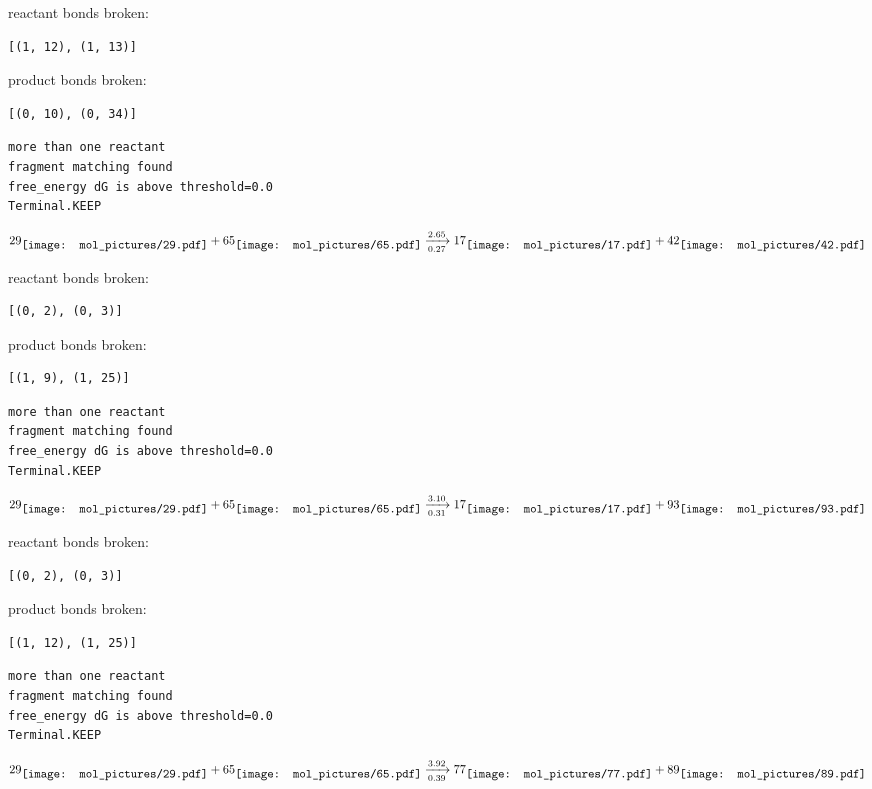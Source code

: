 \documentclass{article}
\begin{document}
reactant bonds broken:\begin{verbatim}
[(1, 12), (1, 13)]
\end{verbatim}
product bonds broken:\begin{verbatim}
[(0, 10), (0, 34)]
\end{verbatim}




\vspace{1cm}
\begin{verbatim}
more than one reactant
fragment matching found
free_energy dG is above threshold=0.0
Terminal.KEEP
\end{verbatim}
$$
29
\raisebox{-.5\height}{\texttt{[image: mol\_pictures/29.pdf]}}
+
65
\raisebox{-.5\height}{\texttt{[image: mol\_pictures/65.pdf]}}
\xrightarrow[0.27]{2.65}
17
\raisebox{-.5\height}{\texttt{[image: mol\_pictures/17.pdf]}}
+
42
\raisebox{-.5\height}{\texttt{[image: mol\_pictures/42.pdf]}}
$$


reactant bonds broken:\begin{verbatim}
[(0, 2), (0, 3)]
\end{verbatim}
product bonds broken:\begin{verbatim}
[(1, 9), (1, 25)]
\end{verbatim}




\vspace{1cm}
\begin{verbatim}
more than one reactant
fragment matching found
free_energy dG is above threshold=0.0
Terminal.KEEP
\end{verbatim}
$$
29
\raisebox{-.5\height}{\texttt{[image: mol\_pictures/29.pdf]}}
+
65
\raisebox{-.5\height}{\texttt{[image: mol\_pictures/65.pdf]}}
\xrightarrow[0.31]{3.10}
17
\raisebox{-.5\height}{\texttt{[image: mol\_pictures/17.pdf]}}
+
93
\raisebox{-.5\height}{\texttt{[image: mol\_pictures/93.pdf]}}
$$


reactant bonds broken:\begin{verbatim}
[(0, 2), (0, 3)]
\end{verbatim}
product bonds broken:\begin{verbatim}
[(1, 12), (1, 25)]
\end{verbatim}




\vspace{1cm}
\begin{verbatim}
more than one reactant
fragment matching found
free_energy dG is above threshold=0.0
Terminal.KEEP
\end{verbatim}
$$
29
\raisebox{-.5\height}{\texttt{[image: mol\_pictures/29.pdf]}}
+
65
\raisebox{-.5\height}{\texttt{[image: mol\_pictures/65.pdf]}}
\xrightarrow[0.39]{3.92}
77
\raisebox{-.5\height}{\texttt{[image: mol\_pictures/77.pdf]}}
+
89
\raisebox{-.5\height}{\texttt{[image: mol\_pictures/89.pdf]}}
$$
\end{document}
